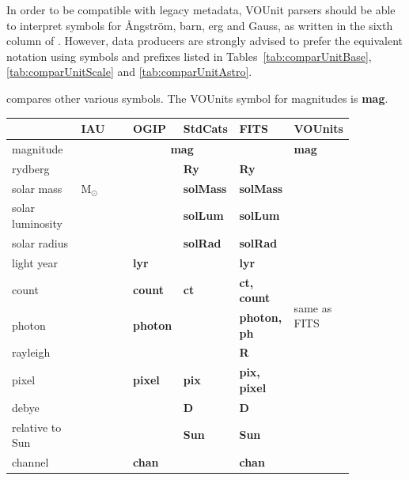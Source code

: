 \documentclass[12pt,notitlepage,onecolumn]{ivoa}
\newcommand{\unit}[1]{\textbf{\textsf{\color{orange}#1}}}
\begin{document}
In order to be compatible with legacy metadata, VOUnit parsers should be able to interpret
symbols for \AA{}ngstr\"om, barn, erg and Gauss, as written in the sixth column of .
However, data producers are strongly advised to prefer the equivalent notation using symbols and prefixes listed in 
Tables~\ref{tab:comparUnitBase}, \ref{tab:comparUnitScale} and \ref{tab:comparUnitAstro}. 

 compares other various symbols. The VOUnits symbol
for magnitudes is \unit{mag}.

\begin{table}
\begin{tabular}{|p{0.2\linewidth}|p{0.15\linewidth}|p{0.12\linewidth}|p{0.12\linewidth}|p{0.12\linewidth}|p{0.15\linewidth}|}
\hline
    & IAU & OGIP  & StdCats & FITS  & VOUnits\\\hline
    magnitude & \multicolumn{4}{c|}{\unit{mag}} & \unit{mag}\\\hline
    rydberg & \unit{} & \unit{} & \unit{Ry} & \unit{Ry} & \multirow{19}{0.15\linewidth}{same as FITS} \\\hline
    solar mass & \unit{$\mathrm{M}_\odot$} &  & \unit{solMass} & \unit{solMass} &\\\cline{1-5}
    solar luminosity & \unit{} & \unit{} & \unit{solLum} & \unit{solLum} &\\\cline{1-5}
    solar radius & \unit{} & \unit{} & \unit{solRad} & \unit{solRad} &\\\cline{1-5}
    light year & \unit{} & \unit{lyr} & \unit{} & \unit{lyr} &\\\cline{1-5}
    count & \unit{} & \unit{count} & \unit{ct} & \unit{ct, count} &\\\cline{1-5}
    photon & \unit{} & \unit{photon} & \unit{} & \unit{photon, ph} &\\\cline{1-5}
    rayleigh & \unit{} & \unit{} & \unit{} & \unit{R} &\\\cline{1-5}
    pixel & \unit{} & \unit{pixel} & \unit{pix} & \unit{pix, pixel} &\\\cline{1-5}
    debye & \unit{} & \unit{} & \unit{D} & \unit{D} &\\\cline{1-5}
    relative to Sun & \unit{} & \unit{} & \unit{Sun} & \unit{Sun} &\\\cline{1-5}
    channel & \unit{} & \unit{chan} & \unit{} & \unit{chan} &\\\cline{1-5}

\end{tabular}
\end{table}
\end{document}
